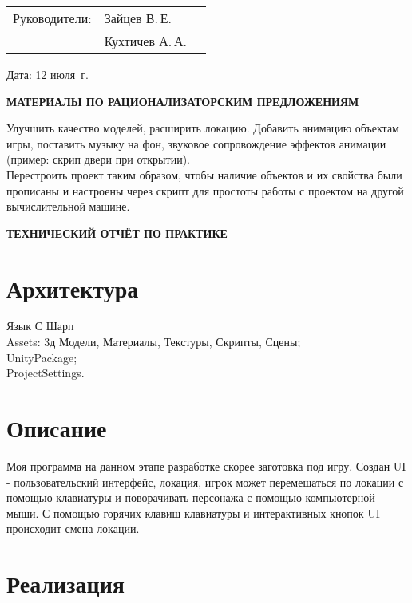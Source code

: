 \documentclass[dvipsnames, pdf, unicode, 12pt, a4paper, oneside, fleqn]{article}
\begin{document}
\vfill

\noindent\begin{tabular}{@{}l l l}
Руководители: & Зайцев В.\,Е. & \underline{\hspace{2in}}\\
 \rule{0pt}{10pt} & Кухтичев А.\,А. & \underline{\hspace{2in}}
\end{tabular}
\vspace{12pt}

\noindent
Дата: 12 июля \the\year\,г.
\pagebreak


\begin{center}
\bfseries{\large МАТЕРИАЛЫ ПО РАЦИОНАЛИЗАТОРСКИМ ПРЕДЛОЖЕНИЯМ}
\end{center}

Улучшить качество моделей, расширить локацию. Добавить анимацию объектам игры, поставить музыку на фон, звуковое сопровождение эффектов анимации (пример: скрип двери при открытии). \\ Перестроить проект таким образом, чтобы наличие объектов и их свойства были прописаны и настроены через скрипт для простоты работы с проектом на другой вычислительной машине. \\ 

\pagebreak

\begin{center}
\bfseries{\large ТЕХНИЧЕСКИЙ ОТЧЁТ ПО ПРАКТИКЕ}
\end{center}

\section*{Архитектура}
Язык С Шарп \\ Assets: 3д Модели, Материалы, Текстуры, Скрипты, Сцены; \\ UnityPackage; \\ ProjectSettings.
\section*{Описание}
Моя программа на данном этапе разработке скорее заготовка под игру. Создан UI - пользовательский интерфейс, локация, игрок может перемещаться по локации с помощью клавиатуры и поворачивать персонажа с помощью компьютерной мыши. С помощью горячих клавиш клавиатуры и интерактивных кнопок UI происходит смена локации.

\section*{Реализация }
\end{document}
